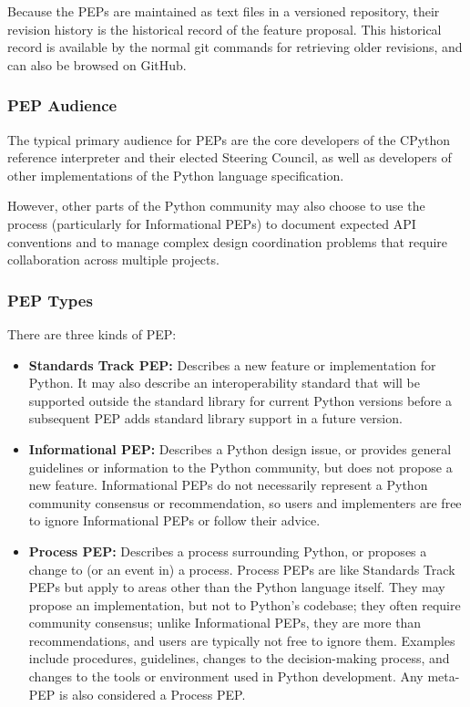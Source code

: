 Because the PEPs are maintained as text files in a versioned repository, their revision history is the historical record of the feature proposal. This historical record is available by the normal git commands for retrieving older revisions, and can also be browsed on GitHub.\\

\subsubsection{PEP Audience}
The typical primary audience for PEPs are the core developers of the CPython reference interpreter and their elected Steering Council, as well as developers of other implementations of the Python language specification.

However, other parts of the Python community may also choose to use the process (particularly for Informational PEPs) to document expected API conventions and to manage complex design coordination problems that require collaboration across multiple projects.\\

\subsubsection{PEP Types}
There are three kinds of PEP:

\begin{itemize}
    \item \textbf{Standards Track PEP:} Describes a new feature or implementation for Python. It may also describe an interoperability standard that will be supported outside the standard library for current Python versions before a subsequent PEP adds standard library support in a future version.
    
    \item \textbf{Informational PEP:} Describes a Python design issue, or provides general guidelines or information to the Python community, but does not propose a new feature. Informational PEPs do not necessarily represent a Python community consensus or recommendation, so users and implementers are free to ignore Informational PEPs or follow their advice.
    
    \item \textbf{Process PEP:} Describes a process surrounding Python, or proposes a change to (or an event in) a process. Process PEPs are like Standards Track PEPs but apply to areas other than the Python language itself. They may propose an implementation, but not to Python’s codebase; they often require community consensus; unlike Informational PEPs, they are more than recommendations, and users are typically not free to ignore them. Examples include procedures, guidelines, changes to the decision-making process, and changes to the tools or environment used in Python development. Any meta-PEP is also considered a Process PEP.
\end{itemize}

